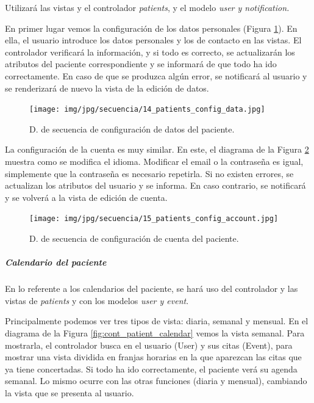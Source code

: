\documentclass[a4paper,oneside,11pt]{book}
\begin{document}
					Utilizará las vistas y el controlador \textit{patients}, y el modelo \textit{user y notification.}
					
					En primer lugar vemos la configuración de los datos personales (Figura \ref{fig:cont_patient_config_data}). En ella, el usuario introduce los datos personales y los de contacto en las vistas. El controlador verificará la información, y si todo es correcto, se actualizarán los atributos del paciente correspondiente y se informará de que todo ha ido correctamente. En caso de que se produzca algún error, se notificará al usuario y se renderizará de nuevo la vista de la edición de datos.
					
					\begin{figure}[H]
					  \centering
					    \texttt{[image: img/jpg/secuencia/14\_patients\_config\_data.jpg]}
					  \caption{D. de secuencia de configuración de datos del paciente.}
					  \label{fig:cont_patient_config_data}
					\end{figure}
					
					La configuración de la cuenta es muy similar. En este, el diagrama de la Figura \ref{fig:cont_patient_config_account} muestra como se modifica el idioma. Modificar el email o la contraseña es igual, simplemente que la contraseña es necesario repetirla. Si no existen errores, se actualizan los atributos del usuario y se informa. En caso contrario, se notificará y se volverá a la vista de edición de cuenta.
					
					\begin{figure}[H]
					  \centering
					    \texttt{[image: img/jpg/secuencia/15\_patients\_config\_account.jpg]}
					  \caption{D. de secuencia de configuración de cuenta del paciente.}
					  \label{fig:cont_patient_config_account}
					\end{figure}
				
			
				\subparagraph{Calendario del paciente} %
				\label{subp:cont_calendario_paciente}
				
					En lo referente a los calendarios del paciente, se hará uso del controlador y las vistas de \textit{patients} y con los modelos \textit{user y event}.
					
					Principalmente podemos ver tres tipos de vista: diaria, semanal y mensual. En el diagrama de la Figura \ref{fig:cont_patient_calendar} vemos la vista semanal. Para mostrarla, el controlador busca en el usuario (User) y sus citas (Event), para mostrar una vista dividida en franjas horarias en la que aparezcan las citas que ya tiene concertadas. Si todo ha ido correctamente, el paciente verá su agenda semanal. Lo mismo ocurre con las otras funciones (diaria y mensual), cambiando la vista que se presenta al usuario.
					
\end{document}

